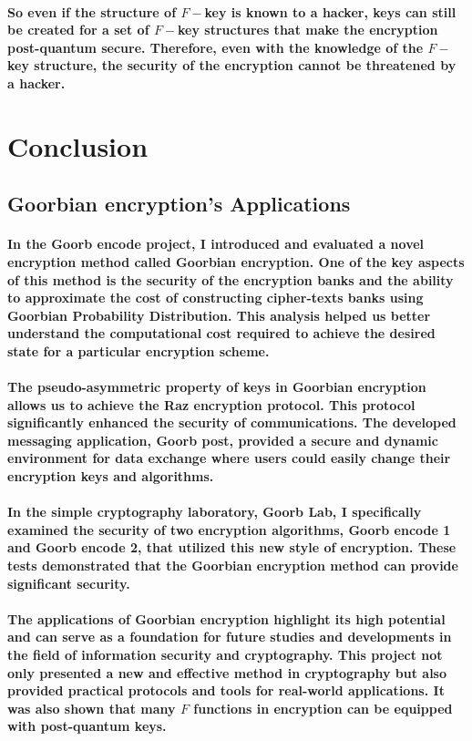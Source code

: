 \documentclass[oneside]{book}
\newcommand{\myparagraph}[1]{\paragraph{\textnormal{#1}}}
\begin{document}
\myparagraph{
So even if the structure of $F-$key is known to a hacker, keys can still be created for a set of $F-$key structures that make the encryption post-quantum secure. Therefore, even with the knowledge of the $F-$key structure, the security of the encryption cannot be threatened by a hacker.
}

\newpage

\section{Conclusion}

\subsection{Goorbian encryption's Applications}

\myparagraph{
In the \textbf{Goorb encode} project, I introduced and evaluated a novel encryption method called \textbf{Goorbian encryption}. One of the key aspects of this method is the security of the encryption banks and the ability to approximate the cost of constructing cipher-texts banks using \textbf{Goorbian Probability Distribution}. This analysis helped us better understand the computational cost required to achieve the desired state for a particular encryption scheme.
}

\myparagraph{
The \textbf{pseudo-asymmetric} property of keys in \textbf{Goorbian encryption} allows us to achieve the \textbf{Raz} encryption protocol. This protocol significantly enhanced the security of communications. The developed messaging application, \textbf{Goorb post}, provided a secure and dynamic environment for data exchange where users could easily change their encryption keys and algorithms.
}

\myparagraph{
In the simple cryptography laboratory, \textbf{Goorb Lab}, I specifically examined the security of two encryption algorithms, \textbf{Goorb encode 1} and \textbf{Goorb encode 2}, that utilized this new style of encryption. These tests demonstrated that the \textbf{Goorbian encryption} method can provide significant security.
}

\myparagraph{
The applications of \textbf{Goorbian encryption} highlight its high potential and can serve as a foundation for future studies and developments in the field of information security and cryptography. This project not only presented a new and effective method in cryptography but also provided practical protocols and tools for real-world applications. It was also shown that many $F$ functions in encryption can be equipped with post-quantum keys.
}
\end{document}
